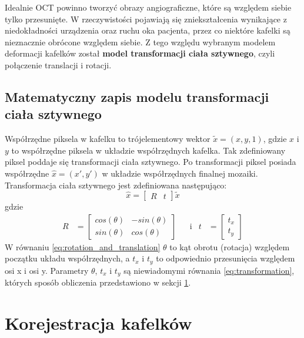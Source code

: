 Idealnie OCT powinno tworzyć obrazy angiograficzne, które są względem siebie tylko przesunięte. W rzeczywistości pojawiają się zniekształcenia wynikające z niedokładności urządzenia oraz ruchu oka pacjenta, przez co niektóre kafelki są nieznacznie obrócone względem siebie. Z tego względu wybranym modelem deformacji kafelków został \textbf{model transformacji ciała sztywnego}, czyli połączenie translacji i rotacji.

\subsection{Matematyczny zapis modelu transformacji ciała sztywnego}

Współrzędne piksela w kafelku to trójelementowy wektor $\widetilde{x}=(x, y, 1)$, gdzie $x$ i $y$ to współrzędne piksela w układzie współrzędnych kafelka. Tak zdefiniowany piksel poddaje się transformacji ciała sztywnego. Po transformacji piksel posiada współrzędne $\hat{x}=(x', y')$ w układzie współrzędnych finalnej mozaiki. Transformacja ciała sztywnego jest zdefiniowana następująco:
\begin{equation}
\hat{x}=\begin{bmatrix}R&t\end{bmatrix}\widetilde{x}
\label{eq:transformation}
\end{equation}
gdzie
\begin{align}
R &= \begin{bmatrix}cos(\theta)&-sin(\theta)\\sin(\theta)&cos(\theta)\end{bmatrix} &&\text{i} & t &= \begin{bmatrix}t_{x}\\t_{y}\end{bmatrix}
\label{eq:rotation_and_translation}
\end{align}
W równaniu \ref{eq:rotation_and_translation} $\theta$ to kąt obrotu (rotacja) względem początku układu współrzędnych, a $t_{x}$ i $t_{y}$ to odpowiednio przesunięcia względem osi x i osi y. Parametry $\theta$, $t_{x}$ i $t_{y}$ są niewiadomymi równania \ref{eq:transformation}, których sposób obliczenia przedstawiono w sekcji \ref{sec:algorytmy_korejestracji:korejestracja_kafelow}.

\section{Korejestracja kafelków}
\label{sec:algorytmy_korejestracji:korejestracja_kafelow}

